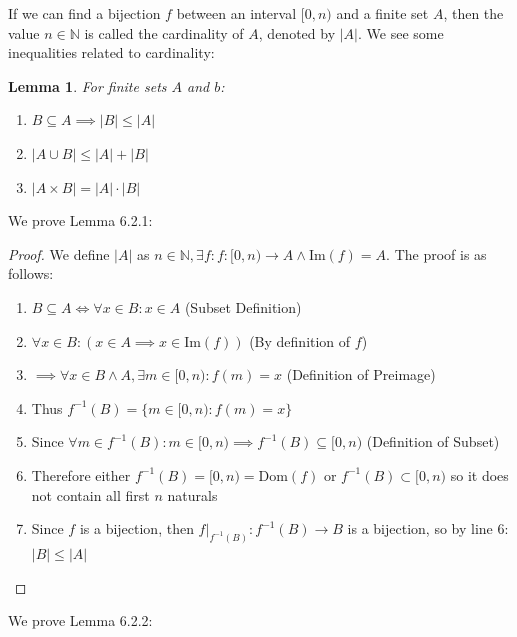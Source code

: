 \documentclass{article}
\newtheorem{lem}{Lemma}[section]
\begin{document}
If we can find a bijection $f$ between an interval $[0, n)$ and a finite set $A$, then the value $n \in \mathbb{N}$ is called the cardinality of $A$, denoted by $|A|$. We see some inequalities related to cardinality:
\begin{lem}
For finite sets $A$ and $b$:
\begin{enumerate}
    \item $B \subseteq A \implies |B| \leqslant |A|$
    \item $|A \cup B| \leqslant |A| + |B|$
    \item $|A \times B| = |A| \cdot |B|$
\end{enumerate}
\end{lem}
We prove Lemma 6.2.1:
\begin{proof}
We define $|A|$ as $n \in \mathbb{N}, \exists f: f: [0, n) \xrightarrow{} A \land \text{Im}(f) = A$. The proof is as follows:
\begin{enumerate}
    \item $B \subseteq A \iff \forall x \in B: x \in A$ (Subset Definition)
    \item $\forall x \in B: (x \in A \implies x \in \text{Im}(f))$ (By definition of $f$)
    \item $\implies \forall x \in B \land A, \exists m \in [0, n): f(m) = x$ (Definition of Preimage)
    \item Thus $f^{-1}(B) = \{m \in [0, n): f(m) = x\}$
    \item Since $\forall m \in f^{-1}(B): m \in [0, n) \implies f^{-1}(B) \subseteq [0, n)$ (Definition of Subset)
    \item Therefore either $f^{-1}(B) = [0, n) = \text{Dom}(f)$ or $f^{-1}(B) \subset [0, n)$ so it does not contain all first $n$ naturals
    \item Since $f$ is a bijection, then $f|_{f^{-1}(B)}: f^{-1}(B) \xrightarrow{} B$ is a bijection, so by line 6: $|B| \leqslant |A|$
\end{enumerate}
\end{proof}
We prove Lemma 6.2.2:
\end{document}
